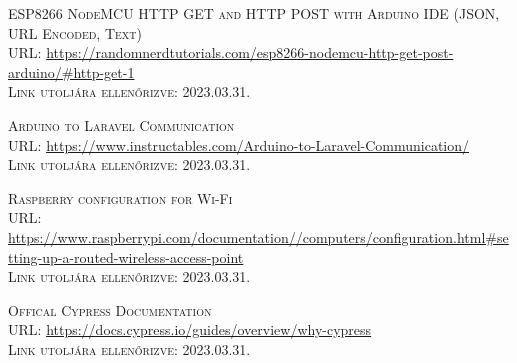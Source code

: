 \documentclass[
]{thesis-ekf}
\theoremstyle{definition}
\theoremstyle{remark}
\begin{document}
\begin{thebibliography}{20}
		\textsc{ESP8266 NodeMCU HTTP GET and HTTP POST with Arduino IDE (JSON, URL Encoded, Text)}\\
		\textsc{URL:} \url{https://randomnerdtutorials.com/esp8266-nodemcu-http-get-post-arduino/#http-get-1}\\
		\textsc{Link utoljára ellenőrizve:} 2023.03.31.
		
		\textsc{Arduino to Laravel Communication}\\
		\textsc{URL:} \url{https://www.instructables.com/Arduino-to-Laravel-Communication/}\\
		\textsc{Link utoljára ellenőrizve:} 2023.03.31.
		
		\textsc{Raspberry configuration for Wi-Fi}\\
		\textsc{URL:} \url{https://www.raspberrypi.com/documentation//computers/configuration.html#setting-up-a-routed-wireless-access-point}\\
		\textsc{Link utoljára ellenőrizve:} 2023.03.31.
	
		\textsc{Offical Cypress Documentation}\\
		\textsc{URL:} \url{https://docs.cypress.io/guides/overview/why-cypress}\\
		\textsc{Link utoljára ellenőrizve:} 2023.03.31.
				
	\end{thebibliography}
	
	
\end{document}
